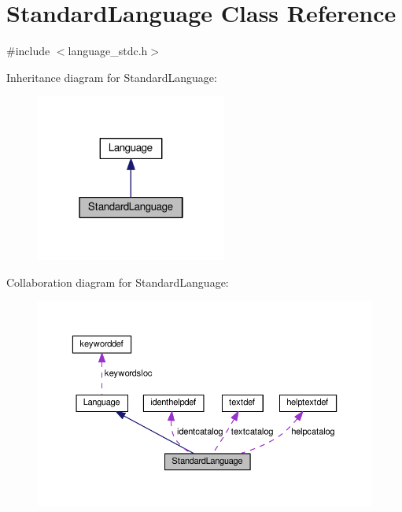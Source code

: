 \hypertarget{classStandardLanguage}{}\section{Standard\+Language Class Reference}
\label{classStandardLanguage}


{\ttfamily \#include $<$language\+\_\+stdc.\+h$>$}



Inheritance diagram for Standard\+Language\+:\nopagebreak
\begin{figure}[H]
\begin{center}
\leavevmode
\includegraphics[width=178pt]{classStandardLanguage__inherit__graph}
\end{center}
\end{figure}


Collaboration diagram for Standard\+Language\+:\nopagebreak
\begin{figure}[H]
\begin{center}
\leavevmode
\includegraphics[width=350pt]{classStandardLanguage__coll__graph}
\end{center}
\end{figure}
